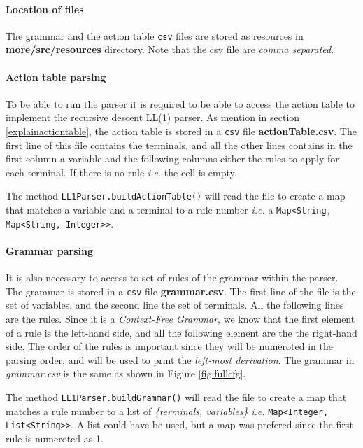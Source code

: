 \documentclass[letterpaper]{article}
\begin{document}
\paragraph{Location of files}
The grammar and the action table \texttt{csv} files are stored
as resources in
\textbf{more/src/resources} directory.
Note that the csv file are \textit{comma separated}.

\paragraph{Action table parsing}
To be able to run the parser it is required to be able to access
the action table to implement
the recursive descent LL(1) parser.
As mention in section \ref{explainactiontable}, the action table is stored
in a \texttt{csv} file \textbf{actionTable.csv}.
The first line of this file contains the
terminals, and all the other lines contains in the first column a variable
and the following columns either the rules to apply for each terminal.
If there is no rule \textit{i.e.} the cell is empty.

The method \texttt{LL1Parser.buildActionTable()} will read the file
to create a map that matches a variable and a terminal to a rule number
\textit{i.e.} a \texttt{Map<String, Map<String, Integer>>}.

\paragraph{Grammar parsing}
It is also necessary to access to set of rules of the grammar within the
parser. The grammar is stored in a \texttt{csv} file \textbf{grammar.csv}.
The first line of the file is the set of variables, and the second line
the set of terminals. All the following lines are the rules.
Since it is a \textit{Context-Free Grammar}, we know that the first element
of a rule is the left-hand side, and all the following element are the
the right-hand side.
The order of the rules is important since they will be numeroted in the parsing
order, and will be used to print the \textit{left-most derivation}.
The grammar in \textit{grammar.csv} is the same as shown in
Figure \ref{fig:fullcfg}.

The method \texttt{LL1Parser.buildGrammar()} will read the file to create
a map that matches a rule number to a list
of \textit{\{terminals, variables\}}
\textit{i.e.} \texttt{Map<Integer, List<String>>}.
A list could have be used, but a map was prefered since the first rule
is numeroted as 1.
\end{document}
